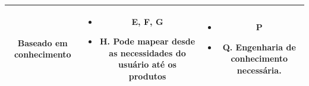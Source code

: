 \begin{table}[ht]
\begin{tabular}{ccc}
	\midrule
	\textbf{Baseado em conhecimento}  & \begin{minipage} [t] {0.3\textwidth} \begin{itemize} \item E, F, G \item H. Pode mapear desde as necessidades do usuário até os produtos\end{itemize} \end{minipage} & \begin{minipage} [t] {0.3\textwidth} \begin{itemize} \item P \item Q. Engenharia de conhecimento necessária.\end{itemize} \end{minipage} \\ 
	\bottomrule	
	\end{tabular}
\end{table}